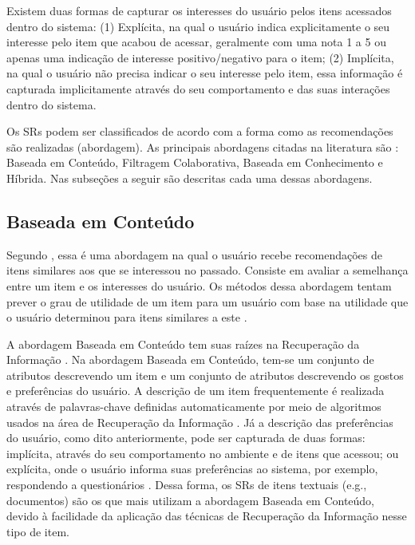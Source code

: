 Existem duas formas de capturar os interesses do usuário pelos itens acessados dentro do sistema: (1) Explícita, na
qual o usuário indica explicitamente o seu interesse pelo item que acabou de acessar, geralmente com uma nota 1 a 5 ou
apenas uma indicação de interesse positivo/negativo para o item; (2) Implícita, na qual o usuário não precisa indicar o
seu interesse pelo item, essa informação é capturada implicitamente através do seu comportamento e das suas interações
dentro do sistema.

Os SRs podem ser classificados de acordo com a forma como as recomendações são realizadas (abordagem). As principais
abordagens citadas na literatura são \cite{torres2004personalizaccao, adomavicius2005toward, ricci2011introduction, bobadilla2013recommender}:
Baseada em Conteúdo, Filtragem Colaborativa, Baseada em Conhecimento e Híbrida. Nas subseções a seguir são descritas
cada uma dessas abordagens.

\subsection{Baseada em Conteúdo}\label{subsection:baseada-em-conteudo}

Segundo , essa é uma abordagem na qual o usuário recebe recomendações de itens
similares aos que se interessou no passado. Consiste em avaliar a semelhança entre um item e os interesses do usuário.
Os métodos dessa abordagem tentam prever o grau de utilidade de um item para um usuário com base na utilidade que o
usuário determinou para itens similares a este \cite{adomavicius2005toward}.

A abordagem Baseada em Conteúdo tem suas raízes na Recuperação da Informação \cite{adomavicius2005toward}. Na
abordagem Baseada em Conteúdo, tem-se um conjunto de atributos descrevendo um item e um conjunto de atributos
descrevendo os gostos e preferências do usuário. A descrição de um item frequentemente é realizada através de
palavras-chave definidas automaticamente por meio de algoritmos usados na área de Recuperação da Informação
\cite{adomavicius2005toward}. Já a descrição das preferências do usuário, como dito anteriormente, pode ser capturada de duas formas: implícita,
através do seu comportamento no ambiente e de itens que acessou; ou explícita, onde o usuário informa suas preferências
ao sistema, por exemplo, respondendo a questionários \cite{adomavicius2005toward}. Dessa forma, os SRs de itens
textuais (e.g., documentos) são os que mais utilizam a abordagem Baseada em Conteúdo, devido à facilidade da aplicação
das técnicas de Recuperação da Informação nesse tipo de item.


